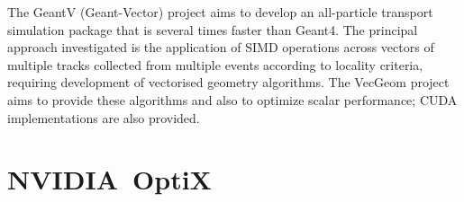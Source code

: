 \documentclass[a4paper]{jpconf}
\begin{document}
The GeantV\cite{GeantV} (Geant-Vector) project aims 
to develop an all-particle transport simulation package that is 
several times faster than Geant4. The principal approach investigated 
is the application of SIMD operations across vectors of multiple tracks 
collected from multiple events according to locality criteria, requiring
development of vectorised geometry algorithms.  
The VecGeom\cite{VecGeom} project aims to provide these algorithms and also 
to optimize scalar performance; CUDA implementations are also provided.
%

%
%
%
%
%
%

\section{NVIDIA\textregistered\ OptiX\texttrademark}
\end{document}
